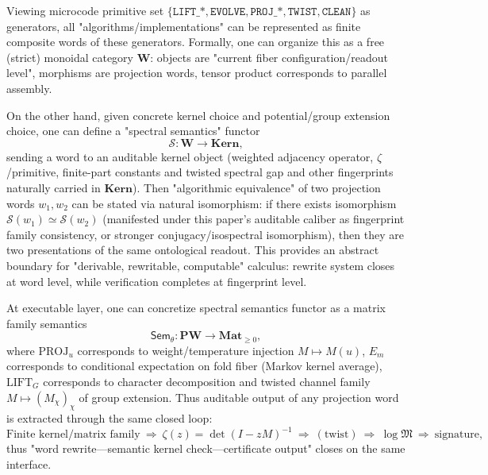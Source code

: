 \begin{remark}[Projection Word Category and Caliber of "Algorithmic Equivalence = Natural Isomorphism"]\label{rem:pom-word-category}
Viewing microcode primitive set
\(
\{\texttt{LIFT\_*},\texttt{EVOLVE},\texttt{PROJ\_*},\texttt{TWIST},\texttt{CLEAN}\}
\)
as generators, all "algorithms/implementations" can be represented as finite composite words of these generators.
Formally, one can organize this as a free (strict) monoidal category \(\mathbf{W}\): objects are "current fiber configuration/readout level", morphisms are projection words, tensor product corresponds to parallel assembly.

On the other hand, given concrete kernel choice and potential/group extension choice, one can define a "spectral semantics" functor
\[
\mathcal{S}:\mathbf{W}\to \mathbf{Kern},
\]
sending a word to an auditable kernel object (weighted adjacency operator, \(\zeta\)/primitive, finite-part constants and twisted spectral gap and other fingerprints naturally carried in \(\mathbf{Kern}\)).
Then "algorithmic equivalence" of two projection words \(w_1,w_2\) can be stated via natural isomorphism: if there exists isomorphism \(\mathcal{S}(w_1)\simeq \mathcal{S}(w_2)\) (manifested under this paper's auditable caliber as fingerprint family consistency, or stronger conjugacy/isospectral isomorphism), then they are two presentations of the same ontological readout.
This provides an abstract boundary for "derivable, rewritable, computable" calculus: rewrite system closes at word level, while verification completes at fingerprint level.
\end{remark}

\begin{remark}\label{rem:pom-sem-functor-loop}
At executable layer, one can concretize spectral semantics functor as a matrix family semantics
\[
\mathsf{Sem}_\theta:\mathbf{PW}\to \mathbf{Mat}_{\ge 0},
\]
where \(\mathrm{PROJ}_u\) corresponds to weight/temperature injection \(M\mapsto M(u)\), \(E_m\) corresponds to conditional expectation on fold fiber (Markov kernel average), \(\mathrm{LIFT}_G\) corresponds to character decomposition and twisted channel family \(M\mapsto (M_\chi)_\chi\) of group extension.
Thus auditable output of any projection word is extracted through the same closed loop:
\[
\text{Finite kernel/matrix family}\ \Rightarrow\ \zeta(z)=\det(I-zM)^{-1}\ \Rightarrow\ (\text{twist})\ \Rightarrow\ \log\mathfrak{M}\ \Rightarrow\ \text{signature},
\]
thus "word rewrite—semantic kernel check—certificate output" closes on the same interface.
\end{remark}

